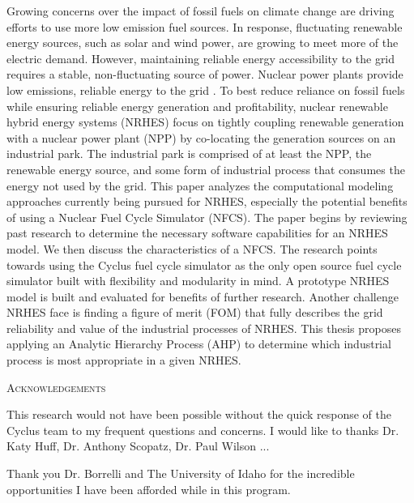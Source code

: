 \documentclass[12pt]{UIdahoMastersThesis}
\begin{document}
Growing concerns over the impact of fossil fuels on climate change are driving efforts to use more low emission fuel sources. In response, fluctuating renewable energy sources, such as solar and wind power, are growing to meet more of the electric demand. However, maintaining reliable energy accessibility to the grid requires a stable, non-fluctuating source of power. Nuclear power plants provide low emissions, reliable energy to the grid \cite{IPCC}. To best reduce reliance on fossil fuels while ensuring reliable energy generation and profitability, nuclear renewable hybrid energy systems (NRHES) focus on tightly coupling renewable generation with a nuclear power plant (NPP) by co-locating the generation sources on an industrial park. The industrial park is comprised of at least the NPP, the renewable energy source, and some form of industrial process that consumes the energy not used by the grid. 
This paper analyzes the computational modeling approaches currently being pursued for NRHES, especially the potential benefits of using a Nuclear Fuel Cycle Simulator (NFCS). The paper begins by reviewing past research to determine the necessary software capabilities for an NRHES model. We then discuss the characteristics of a NFCS. The research points towards using the Cyclus fuel cycle simulator as the only open source fuel cycle simulator built with flexibility and modularity in mind. A prototype NRHES model is built and evaluated for benefits of further research. Another challenge NRHES face is finding a figure of merit (FOM) that fully describes the grid reliability and value of the industrial processes of NRHES. This thesis proposes applying an Analytic Hierarchy Process (AHP) to determine which industrial process is most appropriate in a given NRHES.

\newpage


 \begin{center}
 	{\LARGE\textsc{Acknowledgements}}
 \end{center}
 
This research would not have been possible without the quick response of the Cyclus team to my frequent questions and concerns.  I would like to thanks Dr. Katy Huff, Dr. Anthony Scopatz, Dr. Paul Wilson ...

Thank you Dr. Borrelli and The University of Idaho for the incredible opportunities I have been afforded while in this program.
\end{document}
